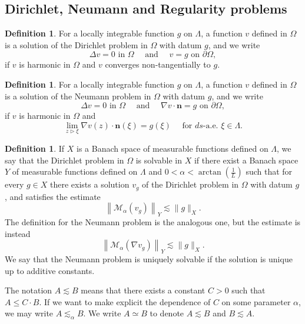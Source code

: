\documentclass[12pt]{amsart}
\theoremstyle{plain}
\theoremstyle{definition}
\newtheorem{definition}[theorem]{Definition}
\numberwithin{equation}{section}
\begin{document}
\subsection{Dirichlet, Neumann and Regularity problems}


\begin{definition}
For a locally integrable function $g$ on $\Lambda$, a function $v$ defined in $\Omega$ is a solution of the Dirichlet problem
in $\Omega$ with datum $g$, and we write
\begin{equation}\label{eq:Dirichlet}
    \Delta v=0\text{ in }\Omega\quad \text{ and }\quad v=g\text{ on }\partial\Omega,
\end{equation}
if $v$ is harmonic in $\Omega$ and $v$ converges non-tangentially to $g$.
\end{definition}



\begin{definition}
For a locally integrable function $g$ on $\Lambda$, a function $v$ defined in $\Omega$ is a solution of the Neumann problem
in $\Omega$ with datum $g$, and we write
\begin{equation}\label{eq:Neumann}
    \Delta v=0\text{ in }\Omega\quad \text{ and }\quad \nabla v\cdot \mathbf{n}=g\text{ on }\partial\Omega,
\end{equation}
 if $v$ is harmonic in $\Omega$ and 
\[
\lim _{z \triangleright \xi} \nabla v(z)\cdot \mathbf{n}(\xi)=g(\xi)\quad \text{ for } ds\text{-a.e. } \xi \in \Lambda.
\]
\end{definition}



\begin{definition}\label{def:definitionSolvability}
If $X$ is a Banach space of measurable functions defined on $\Lambda$, we say that the Dirichlet problem in $\Omega$ is solvable in $X$ if there exist a Banach space $Y$ of measurable functions defined on $\Lambda$ and $0<\alpha<\arctan (\frac{1}{L})$ such that for every $g \in X$ there exists a solution $v_g$ of the Dirichlet problem in $\Omega$ with datum $g$, and satisfies the estimate
\[
\left\|\mathcal{M}_\alpha (v_g)\right\|_Y
\lesssim
\|g\|_X.
\]
The definition for the Neumann problem is the analogous one, but the estimate is instead
\[
\left\|\mathcal{M}_\alpha(\nabla v_g)\right\|_Y \lesssim\|g\|_X.
\]
We say that the Neumann problem is uniquely solvable if the solution is unique up to additive constants.
\end{definition}


The notation $A\lesssim B$ means that there exists a constant $C>0$ such that $A\leq C\cdot B$. If we want to make explicit the dependence of $C$ on some parameter $\alpha$, we may write $A\lesssim_{\alpha} B$. We write $A\simeq B$ to denote $A\lesssim B$ and $B\lesssim A$.
\end{document}
